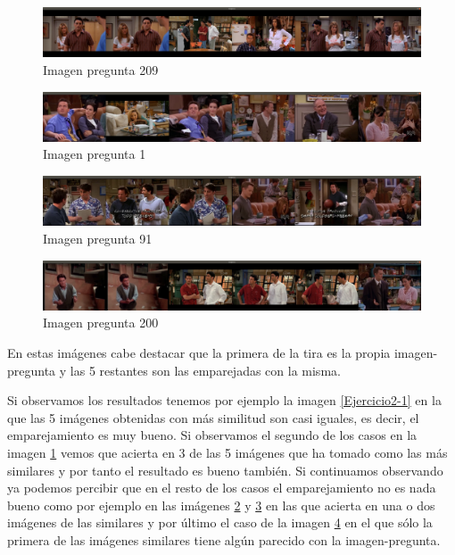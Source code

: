 \documentclass[12pt,a4paper]{article}
\begin{document}
\begin{figure}[H]
  \centering
  \includegraphics[scale=0.135]{./Imagenes/Ejercicio2-2.png}
  \caption{Imagen pregunta 209}
	\label{Ejercicio2-2}
\end{figure}

\begin{figure}[H]
  \centering
  \includegraphics[scale=0.135]{./Imagenes/Ejercicio2-3.png}
  \caption{Imagen pregunta 1}
	\label{Ejercicio2-3}
\end{figure}

\begin{figure}[H]
  \centering
  \includegraphics[scale=0.135]{./Imagenes/Ejercicio2-4.png}
  \caption{Imagen pregunta 91}
	\label{Ejercicio2-4}
\end{figure}

\begin{figure}[H]
  \centering
  \includegraphics[scale=0.135]{./Imagenes/Ejercicio2-5.png}
  \caption{Imagen pregunta 200}
	\label{Ejercicio2-5}
\end{figure}

En estas imágenes cabe destacar que la primera de la tira es la propia imagen-pregunta y las 5 restantes son las emparejadas con la misma.

\vspace{10px}

Si observamos los resultados tenemos por ejemplo la imagen \ref{Ejercicio2-1} en la que las 5 imágenes obtenidas con más similitud son casi iguales, es decir, el emparejamiento es muy bueno. Si observamos el segundo de los casos en la imagen \ref{Ejercicio2-2} vemos que acierta en 3 de las 5 imágenes que ha tomado como las más similares y por tanto el resultado es bueno también. Si continuamos observando ya podemos percibir que en el resto de los casos el emparejamiento no es nada bueno como por ejemplo en las imágenes \ref{Ejercicio2-3} y \ref{Ejercicio2-4} en las que acierta en una o dos imágenes de las similares y por último el caso de la imagen \ref{Ejercicio2-5} en el que sólo la primera de las imágenes similares tiene algún parecido con la imagen-pregunta.
\end{document}
